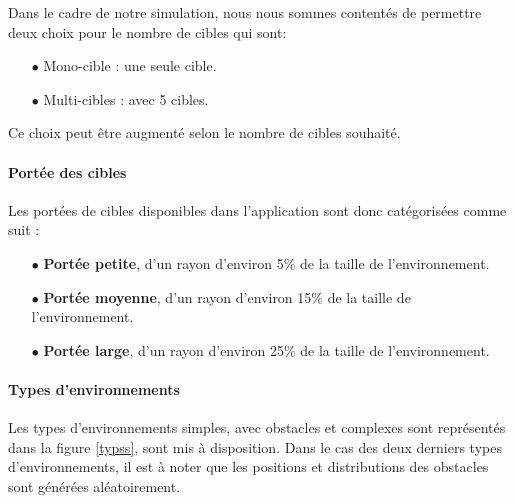 	Dans le cadre de notre simulation, nous nous sommes contentés de permettre deux choix pour le nombre de cibles qui sont:
	\begin{itemize}
		\item [$\bullet$] Mono-cible : une seule cible.
		\item [$\bullet$] Multi-cibles : avec 5 cibles.
	\end{itemize}
	Ce choix peut être augmenté selon le nombre de cibles souhaité.
	

	
	\paragraph{Portée des cibles}
	Les portées de cibles disponibles dans l'application sont donc catégorisées comme suit :
	\vspace{0.3cm}
	\begin{itemize}
		\item [$\bullet$] \textbf{Portée petite}, d'un rayon d'environ 5\% de la taille de l'environnement.
		\item [$\bullet$] \textbf{Portée moyenne}, d'un rayon d'environ 15\% de la taille de l'environnement.
		\item [$\bullet$] \textbf{Portée large}, d'un rayon d'environ 25\% de la taille de l'environnement.
	\end{itemize}
	
	\paragraph{Types d'environnements}
	Les types d'environnements simples, avec obstacles et complexes sont représentés dans la figure \ref{typss}, sont mis à disposition. Dans le cas des deux derniers types d'environnements, il est à noter que les positions et distributions des obstacles sont générées aléatoirement.
		
